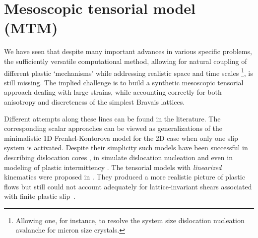 \documentclass[CRPHYS,Unicode,manuscript]{cedram}
\begin{document}
 
 


\section{Mesoscopic  tensorial  model (MTM)}
 
We have seen that despite many important advances  in various specific problems, the sufficiently versatile  computational method, allowing for  natural coupling of different   plastic `mechanisms'  while  addressing  realistic space and time scales \footnote{Allowing one, for instance, to resolve the system size dislocation nucleation avalanche for  micron size  crystals.}, is still missing.  The  implied challenge is to   build  a synthetic mesoscopic tensorial  approach dealing with large   strains, while accounting correctly for  both  anisotropy and   discreteness of  the simplest Bravais  lattices.
 
Different attempts along these lines can be found in the literature.  The corresponding    scalar approaches \cite{Landu1994-wt,Carpio2003-yu,Salman2011-ij} can be viewed as  generalizations of the  minimalistic  1D  Frenkel-Kontorova  model \cite{Frenkel1939-tk,Peierls2002-xo,Nabarro2002-js} for the 2D case when only one slip system is activated.  Despite their simplicity such models have been successful in describing  dislocation cores \cite{Kovalev1993-se},  in  simulate dislocation nucleation  \cite{lomdahl1986dislocation,srolovitz1986dislocation,Plans2007-cx,Bonilla2007-jk,Geslin2014-ad} and  even in modeling of plastic intermittency \cite{Salman2012-oa,Zhang2020-ax}.
The  tensorial   models   with    \emph{linearized} kinematics were proposed  in \cite{bulatov1994stochastic, Minami2007-ew,Onuki2003-ln,Carpio2005-fl}.  They produced  a more realistic  picture of plastic flows but  still could not account adequately  for   lattice-invariant  shears  associated with finite plastic  slip~\cite{kaxiras1994energetics}.  
\end{document}
